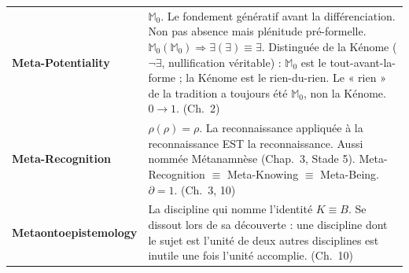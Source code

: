 \documentclass[10pt, openany, oneside]{book}
\begin{document}
{\begin{tabular}{@{} l @{\hspace{0.6em}} p{} @{}}
\textbf{Meta-Potentiality} & $\mathbb{M}_0$. Le fondement génératif avant la différenciation. Non pas absence mais plénitude pré-formelle. $\mathbb{M}_0(\mathbb{M}_0) \Rightarrow \exists(\exists) \equiv \exists$. Distinguée de la Kénome ($\neg\exists$, nullification véritable) : $\mathbb{M}_0$ est le tout-avant-la-forme ; la Kénome est le rien-du-rien. Le « rien » de la tradition a toujours été $\mathbb{M}_0$, non la Kénome. $0 \to 1$. (Ch.\ 2) \\[0.3em]
\textbf{Meta-Recognition} & $\rho(\rho) = \rho$. La reconnaissance appliquée à la reconnaissance EST la reconnaissance. Aussi nommée Métanamnèse (Chap.\ 3, Stade 5). Meta-Recognition $\equiv$ Meta-Knowing $\equiv$ Meta-Being. $\partial = 1$. (Ch.\ 3, 10) \\[0.3em]
\textbf{Metaontoepistemology} & La discipline qui nomme l'identité $K \equiv B$. Se dissout lors de sa découverte : une discipline dont le sujet est l'unité de deux autres disciplines est inutile une fois l'unité accomplie. (Ch.\ 10) \\[0.3em]
\end{tabular}
}

\newpage
\end{document}
